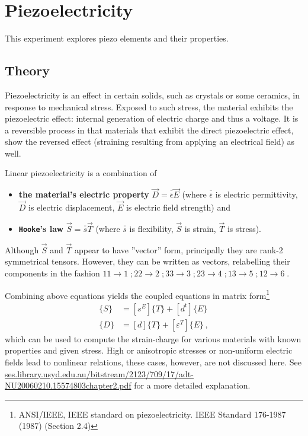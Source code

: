\chapter{Piezoelectricity}
This experiment explores piezo elements and their properties.

\section{Theory}
Piezoelectricity is an effect in certain solids, such as crystals or some ceramics, in response to mechanical stress.
Exposed to such stress, the material exhibits the piezoelectric effect: internal generation of electric charge and thus a voltage.
It is a reversible process in that materials that exhibit the direct piezoelectric effect, show the reversed effect (straining resulting from applying an electrical field) as well.

Linear piezoelectricity is a combination of
\begin{itemize}
	\item \textbf{the material's electric property} $\vec{D}=\overline{\overline{\epsilon}}\vec{E}$ (where $\overline{\overline{\epsilon}}$ is electric permittivity, $\vec{D}$ is electric displacement, $\vec{E}$ is electric field strength) and
	\item \textbf{\texttt{Hooke}'s law} $\vec{S}=\overline{\overline{s}}\vec{T}$ (where $\overline{\overline{s}}$ is flexibility, $\vec{S}$ is strain, $\vec{T}$ is stress).
\end{itemize}
Although $\vec{S}$ and $\vec{T}$ appear to have ''vector'' form, principally they are rank-2 symmetrical tensors.
However, they can be written as vectors, relabelling their components in the fashion $11 \rightarrow 1 \;;  22 \rightarrow 2 \;;  33 \rightarrow 3 \;;  23 \rightarrow 4 \;;  13 \rightarrow 5 \; ;  12 \rightarrow 6 \;$.

Combining above equations yields the coupled equations in matrix form\footnote{ANSI/IEEE, IEEE standard on piezoelectricity. IEEE Standard 176-1987 (1987) (Section 2.4)}
\begin{align*}
	\{S\} &= \left [s^E \right ]\{T\}+[d^\mathrm{t}]\{E\} \\
	\{D\} &= [d]\{T\}+\left [ \varepsilon^T \right ] \{E\} \,,
\end{align*}
which can be used to compute the strain-charge for various materials with known properties and given stress.
High or anisotropic stresses or non-uniform electric fields lead to nonlinear relations, these cases, however, are not discussed here.
See \url{ses.library.usyd.edu.au/bitstream/2123/709/17/adt-NU20060210.15574803chapter2.pdf} for a more detailed explanation.
\clearpage
